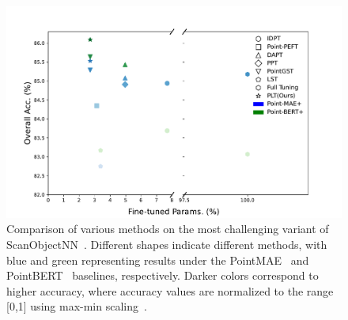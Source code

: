 \begin{figure}
    \centering
    \includegraphics[width=\linewidth]{fig/sota1.pdf}
    \caption{Comparison of various methods on the most challenging variant of ScanObjectNN~\cite{uy2019revisiting}. Different shapes indicate different methods, with blue and green representing results under the PointMAE~\cite{pang2022masked} and PointBERT~\cite{yu2022point} baselines, respectively. Darker colors correspond to higher accuracy, where accuracy values are normalized to the range [0,1] using max-min scaling~\cite{panda2014smoothing}.
}
    \label{fig:sota}
\end{figure}